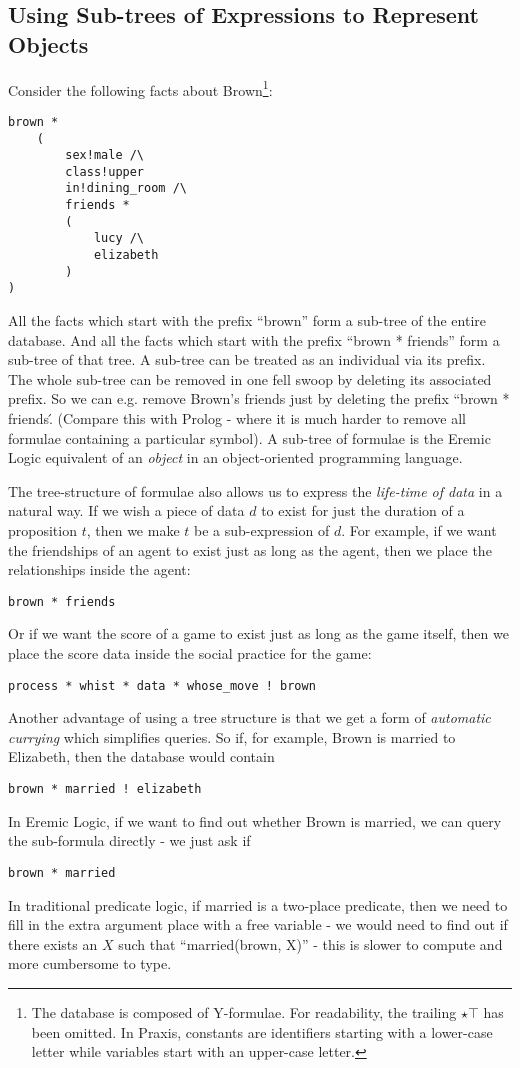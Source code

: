 \subsection{Using Sub-trees of Expressions to Represent Objects}
Consider the following facts about Brown\footnote{The database is composed of Y-formulae. For readability, the trailing $\star \top$ has been omitted. In Praxis, constants are identifiers starting with a lower-case letter while variables start with an upper-case letter.}:
\begin{verbatim}
brown *
    (
        sex!male /\
        class!upper
        in!dining_room /\
        friends *
        (
            lucy /\
            elizabeth
        )
)
\end{verbatim}
All the facts which start with the prefix ``brown'' form a sub-tree of the entire database.
And all the facts which start with the prefix ``brown * friends'' form a sub-tree of that tree.
A sub-tree can be treated as an individual via its prefix.
The whole sub-tree can be removed in one fell swoop by deleting its associated prefix.
So we can e.g. remove Brown's friends just by deleting the prefix ``brown * friends\'.
(Compare this with Prolog - where it is much harder to remove all formulae containing a particular symbol).
A sub-tree of formulae is the Eremic Logic equivalent of an \emph{object} in an object-oriented programming language.

The tree-structure of formulae also allows us to express the \emph{life-time of data} in a natural way. 
If we wish a piece of data $d$ to exist for just the duration of a proposition $t$, then we make $t$ be a sub-expression of $d$. 
For example, if we want the friendships of an agent to exist just as long as the agent, then we place the relationships inside the agent: 
\begin{verbatim}
brown * friends
\end{verbatim}
Or if we want the score of a game to exist just as long as the game itself, then we place the score data inside the social practice for the game: 
\begin{verbatim}
process * whist * data * whose_move ! brown
\end{verbatim}

Another advantage of using a tree structure is that we get a form of \emph{automatic currying} which simplifies queries.
So if, for example, Brown is married to Elizabeth, then the database would contain 
\begin{verbatim}
brown * married ! elizabeth
\end{verbatim}
In Eremic Logic, if we want to find out whether Brown is married, we can query the sub-formula directly -  we just ask if 
\begin{verbatim}
brown * married
\end{verbatim}
In traditional predicate logic, if married is a two-place predicate, then we need to fill in the extra argument place with a free variable - we would need to find out if there exists an $X$ such that ``married(brown, X)'' - this is slower to compute and more cumbersome to type. 

